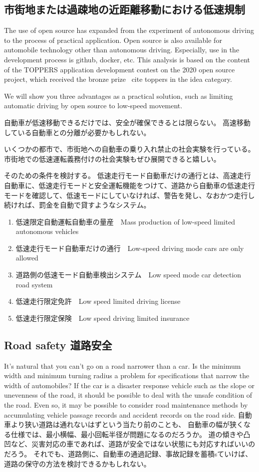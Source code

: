 \documentclass[twocolumn]{article} %
\begin{document}
\subsection{市街地または過疎地の近距離移動における低速規制}
The use of open source has expanded from the experiment of autonomous driving to the process of practical application.
Open source is also available for automobile technology other than autonomous driving.
Especially, use in the development process is github, docker, etc.
This analysis is based on the content of the TOPPERS application development contest on the 2020 open source project, which received the bronze prize \ cite {toppers} in the idea category.

We will show you three advantages as a practical solution, such as limiting automatic driving by open source to low-speed movement.

自動車が低速移動できるだけでは、安全が確保できるとは限らない。
高速移動している自動車との分離が必要かもしれない。

いくつかの都市で、市街地への自動車の乗り入れ禁止の社会実験を行っている。
市街地での低速運転義務付けの社会実験もぜひ展開できると嬉しい。

そのための条件を検討する。
低速走行モード自動車だけの通行とは、高速走行自動車に、低速走行モードと安全運転機能をつけて、道路から自動車の低速走行モードを確認して、低速モードにしていなければ、警告を発し、なおかつ走行し続ければ、罰金を自動で貸すようなシステム。
\begin{enumerate}
\item 低速限定自動運転自動車の量産　Mass production of low-speed limited autonomous vehicles
\item 低速走行モード自動車だけの通行　Low-speed driving mode cars are only allowed
\item 道路側の低速モード自動車検出システム　Low speed mode car detection road system
\item 低速走行限定免許　Low speed limited driving license
\item 低速走行限定保険　Low speed driving limited insurance 
\end{enumerate}


\subsection{Road safety 道路安全}
It's natural that you can't go on a road narrower than a car.
Is the minimum width and minimum turning radius a problem for specifications that narrow the width of automobiles?
If the car is a disaster response vehicle such as the slope or unevenness of the road, it should be possible to deal with the unsafe condition of the road.
Even so, it may be possible to consider road maintenance methods by accumulating vehicle passage records and accident records on the road side.
自動車より狭い道路は通れないはずという当たり前のことも、
自動車の幅が狭くなる仕様では、最小横幅、最小回転半径が問題になるのだろうか。
道の傾きや凸凹など、災害対応の車であれば、道路が安全ではない状態にも対応すればいいのだろう。
それでも、道路側に、自動車の通過記録、事故記録を蓄積sていけば、道路の保守の方法を検討できるかもしれない。
\end{document}
